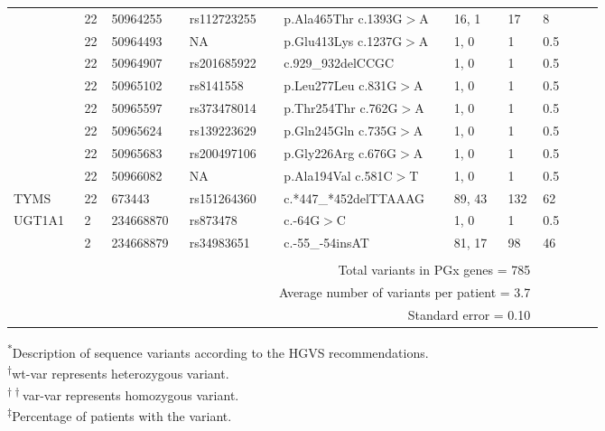 \begin{longtable}{p{0.09\linewidth}|p{0.02\linewidth}p{0.1\linewidth}p{0.14\linewidth}p{0.2\linewidth}p{0.08\linewidth}p{0.04\linewidth}p{0.09\linewidth}}
		& 22 & 50964255 & rs112723255 & p.Ala465Thr c.1393G$>$A & 16, 1 & 17 & 8
		\\
		& 22 & 50964493 & NA & p.Glu413Lys c.1237G$>$A & 1, 0 & 1 & 0.5
		\\
		& 22 & 50964907 & rs201685922 & c.929\_932delCCGC & 1, 0 & 1 & 0.5
		\\
		& 22 & 50965102 & rs8141558 & p.Leu277Leu c.831G$>$A & 1, 0 & 1 & 0.5
		\\
		& 22 & 50965597 & rs373478014 & p.Thr254Thr c.762G$>$A & 1, 0 & 1 & 0.5
		\\
		& 22 & 50965624 & rs139223629 & p.Gln245Gln c.735G$>$A & 1, 0 & 1 & 0.5
		\\
		& 22 & 50965683 & rs200497106 & p.Gly226Arg c.676G$>$A & 1, 0 & 1 & 0.5
		\\
		& 22 & 50966082 & NA & p.Ala194Val c.581C$>$T & 1, 0 & 1 & 0.5
		\\
		\hline
		TYMS & 22 & 673443 & rs151264360 & \footnotesize{c.*447\_*452delTTAAAG} & 89, 43 & 132 & 62
		\\
		\hline
		UGT1A1 & 2 & 234668870 & rs873478 & c.-64G$>$C & 1, 0 & 1 & 0.5
		\\
		& 2 & 234668879 & rs34983651 & c.-55\_-54insAT & 81, 17 & 98 & 46
		\\
		\hline
		\\
		&
		\multicolumn{6}{r}{Total variants in PGx genes = 785}
		\\
		&
		\multicolumn{6}{r}{Average number of variants per patient = 3.7}
		\\
		&
		\multicolumn{6}{r}{Standard error = 0.10}
		\\
		\hline
\end{longtable}
\noindent\textsuperscript{*}Description of sequence variants according to the HGVS recommendations.
\\
\textsuperscript{$\dagger$}wt-var represents heterozygous variant.
\\
\textsuperscript{$\dagger\dagger$}var-var represents homozygous variant.
\\\textsuperscript{$\ddagger$}Percentage of patients with the variant.



